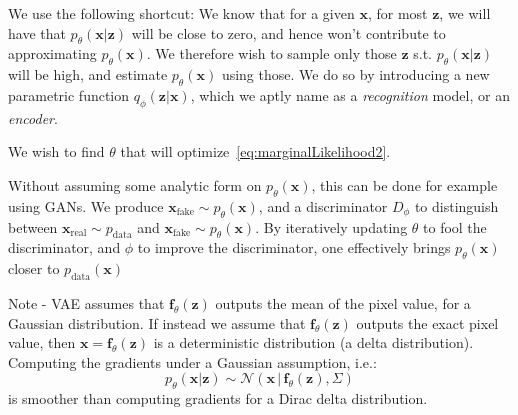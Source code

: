 \documentclass{article}
\begin{document}
We use the following shortcut: We know that for a given $\bm{x}$, for most $\bm{z}$, we will have that  $p_{\theta}(\bm{x} | \bm{z})$ will be close to zero, and hence won't contribute to approximating $p_{\theta}(\bm{x})$. 
We therefore wish to sample only those $\bm{z}$ s.t. $p_{\theta}(\bm{x} | \bm{z})$ will be high, and estimate $p_{\theta}(\bm{x})$ using those. 
We do so by introducing a new parametric function $q_{\phi}(\bm{z} | \bm{x})$, which we aptly name as a \textit{recognition} model, or an \textit{encoder}.

\begin{remark} We wish to find $\theta$  that will optimize~\cref{eq:marginalLikelihood2}. 

Without assuming some analytic form on $p_{\theta}(\bm{x})$, this can be done for example using GANs. 
We produce $\bm{x}_{\text{fake}} \sim  p_{\theta}(\bm{x})$, and a discriminator $D_{\phi}$ to distinguish between $\bm{x}_{\text{real}} \sim  p_{\text{data}}$ and $\bm{x}_{\text{fake}} \sim p_{\theta}(\bm{x})$.  
By iteratively updating $\theta$ to fool the discriminator, and $\phi$ to improve the discriminator, one effectively brings $p_{\theta}(\bm{x})$ closer to $p_{\text{data}}(\bm{x})$
\end{remark}

\begin{remark}
Note - VAE assumes that $\bm{f}_{\theta}(\bm{z})$ outputs the mean of the pixel value, for a Gaussian distribution. If instead we assume that $\bm{f}_{\theta}(\bm{z})$ outputs the exact pixel value, then $\bm{x}= \bm{f}_{\theta}(\bm{z})$ is a deterministic distribution (a delta distribution). 
Computing the gradients under a Gaussian assumption, i.e.:
\[
  p_{\theta}(\bm{x} | \bm{z}) \sim  \mathcal{N}(\bm{x} \, | \, \bm{f}_{\theta}(\bm{z}), \Sigma)
\]
  is smoother than computing gradients for a Dirac delta distribution. 
\end{remark}
\end{document}

